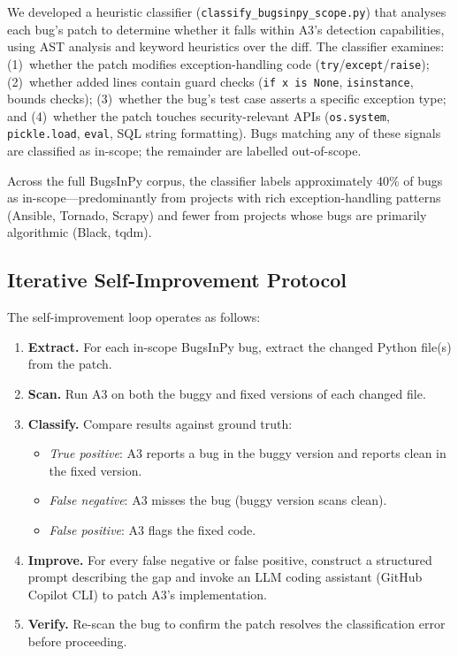 \documentclass[sigconf,review,anonymous]{acmart}
\begin{document}
We developed a heuristic classifier (\texttt{classify\_bugsinpy\_scope.py}) that analyses each bug's patch to determine whether it falls within \textsc{A3}'s detection capabilities, using AST analysis and keyword heuristics over the diff.
The classifier examines: (1)~whether the patch modifies exception-handling code (\texttt{try}/\texttt{except}/\texttt{raise}); (2)~whether added lines contain guard checks (\texttt{if x is None}, \texttt{isinstance}, bounds checks); (3)~whether the bug's test case asserts a specific exception type; and (4)~whether the patch touches security-relevant APIs (\texttt{os.system}, \texttt{pickle.load}, \texttt{eval}, SQL string formatting).
Bugs matching any of these signals are classified as in-scope; the remainder are labelled out-of-scope.

Across the full BugsInPy corpus, the classifier labels approximately 40\% of bugs as in-scope---predominantly from projects with rich exception-handling patterns (Ansible, Tornado, Scrapy) and fewer from projects whose bugs are primarily algorithmic (Black, tqdm).

\subsection{Iterative Self-Improvement Protocol}

The self-improvement loop operates as follows:

\begin{enumerate}
  \item \textbf{Extract.} For each in-scope BugsInPy bug, extract the changed Python file(s) from the patch.
  \item \textbf{Scan.} Run \textsc{A3} on both the buggy and fixed versions of each changed file.
  \item \textbf{Classify.} Compare results against ground truth:
    \begin{itemize}
      \item \emph{True positive}: \textsc{A3} reports a bug in the buggy version and reports clean in the fixed version.
      \item \emph{False negative}: \textsc{A3} misses the bug (buggy version scans clean).
      \item \emph{False positive}: \textsc{A3} flags the fixed code.
    \end{itemize}
  \item \textbf{Improve.} For every false negative or false positive, construct a structured prompt describing the gap and invoke an LLM coding assistant (GitHub Copilot CLI) to patch \textsc{A3}'s implementation.
  \item \textbf{Verify.} Re-scan the bug to confirm the patch resolves the classification error before proceeding.
\end{enumerate}
\end{document}
